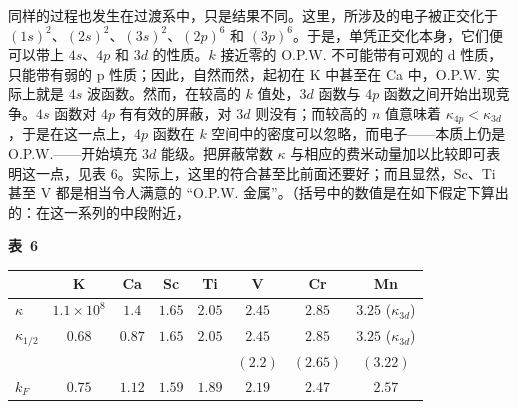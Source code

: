 同样的过程也发生在过渡系中，只是结果不同。这里，所涉及的电子被正交化于 $(1s)^2$、$(2s)^2$、$(3s)^2$、$(2p)^6$ 和 $(3p)^6$。于是，单凭正交化本身，它们便可以带上 $4s$、$4p$ 和 $3d$ 的性质。$k$ 接近零的 O.P.W. 不可能带有可观的 d 性质，只能带有弱的 p 性质；因此，自然而然，起初在 K 中甚至在 Ca 中，O.P.W. 实际上就是 $4s$ 波函数。然而，在较高的 $k$ 值处，$3d$ 函数与 $4p$ 函数之间开始出现竞争。$4s$ 函数对 $4p$ 有有效的屏蔽，对 $3d$ 则没有；而较高的 $n$ 值意味着 $\kappa_{4p} < \kappa_{3d}$，于是在这一点上，$4p$ 函数在 $k$ 空间中的密度可以忽略，而电子——本质上仍是 O.P.W.——开始填充 $3d$ 能级。把屏蔽常数 $\kappa$ 与相应的费米动量加以比较即可表明这一点，见表 6。实际上，这里的符合甚至比前面还要好；而且显然，Sc、Ti 甚至 V 都是相当令人满意的 “O.P.W. 金属”。（括号中的数值是在如下假定下算出的：在这一系列的中段附近，
\begin{table}[htbp]
\centering
{\bfseries 表~6}\\[5pt]
\begin{tabular}{lccccccc}
\toprule
 & K & Ca & Sc & Ti & V & Cr & Mn\\
\midrule
$\kappa$ & $1.1\times10^{8}$ & $1.4$ & $1.65$ & $2.05$ & $2.45$ & $2.85$ & $3.25$ ($\kappa_{3d}$)\\
$\kappa_{1/2}$ & $0.68$ & $0.87$ & $1.65$ & $2.05$ & $2.45$ & $2.85$ & $3.25$ ($\kappa_{3d}$)\\
 & & & & & $(2.2)$ & $(2.65)$ & $(3.22)$\\
$k_F$ & $0.75$ & $1.12$ & $1.59$ & $1.89$ & $2.19$ & $2.47$ & $2.57$\\
\bottomrule
\end{tabular}
\end{table}

